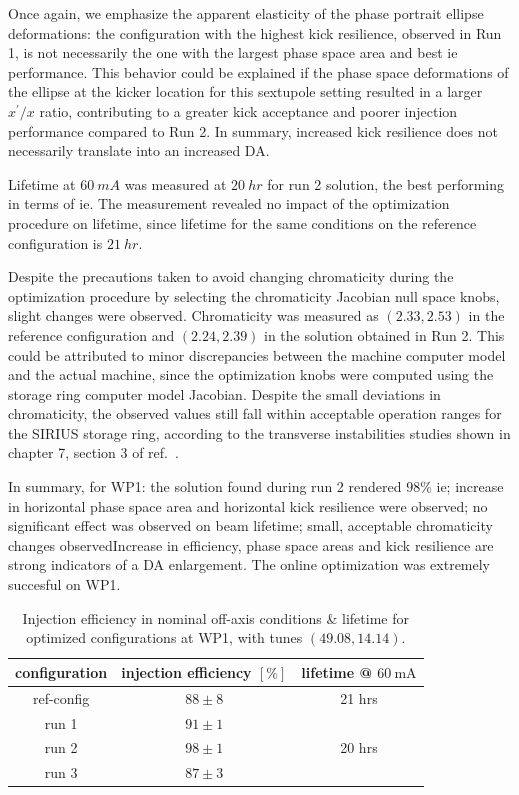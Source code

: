 Once again, we emphasize the apparent elasticity of the phase portrait ellipse deformations: the configuration with the highest kick resilience, observed in Run 1, is not necessarily the one with the largest phase space area and best \gls*{ie} performance. This behavior could be explained if the phase space deformations of the ellipse at the kicker location for this sextupole setting resulted in a larger $x^\prime/x$ ratio, contributing to a greater kick acceptance and poorer injection performance compared to Run 2. In summary, increased kick resilience does not necessarily translate into an increased \gls*{DA}.

Lifetime at $60~\unit{mA}$ was measured at $20~\unit{hr}$ for run 2 solution, the best performing in terms of \gls*{ie}. The measurement revealed no impact of the optimization procedure on lifetime, since lifetime for the same conditions on the reference configuration is $21~\unit{hr}$.

Despite the precautions taken to avoid changing chromaticity during the optimization procedure by selecting the chromaticity Jacobian null space knobs, slight changes were observed. Chromaticity was measured as $(2.33, 2.53)$ in the reference configuration and $(2.24, 2.39)$ in the solution obtained in Run 2. This could be attributed to minor discrepancies between the machine computer model and the actual machine, since the optimization knobs were computed using the storage ring computer model Jacobian. Despite the small deviations in chromaticity, the observed values still fall within acceptable operation ranges for the SIRIUS storage ring, according to the transverse instabilities studies shown in chapter 7, section 3 of ref.~\cite{sa_study_2018}.

In summary, for \gls*{WP1}: the solution found during run 2 rendered $98\%$ \gls*{ie}; increase in horizontal phase space area and horizontal kick resilience were observed; no significant effect was observed on beam lifetime; small, acceptable chromaticity changes observedIncrease in efficiency, phase space areas and kick resilience are strong indicators of a \gls*{DA} enlargement. The online optimization was extremely succesful on \gls*{WP1}.

\begin{table}[htb]
    \centering
    \caption{Injection efficiency in nominal off-axis conditions \& lifetime for optimized configurations at WP1, with tunes $(49.08, 14.14)$.}
    \begin{tabular}{ccc}
    \hline
    configuration & injection efficiency $[\%]$ & lifetime @ $\unit{60~\milli\ampere}$ \\ \hline
    ref-config    & $88\pm8$                    & 21 hrs    \\
    run 1         & $91\pm1$                    &           \\
    run 2         & $98\pm1$                    &  20 hrs   \\
    run 3         & $87\pm3$                    &           \\ \hline
    \end{tabular}
    \label{tb:wp1summary}
    \end{table}

